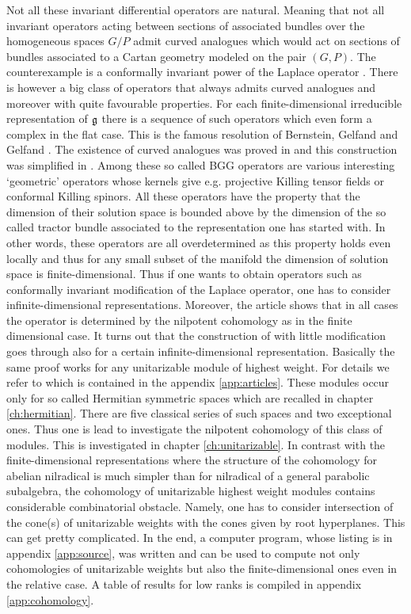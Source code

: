 Not all these invariant differential operators are natural. Meaning that not all invariant operators acting between sections of associated bundles over the homogeneous spaces $G/P$ admit curved analogues which would act on sections of bundles associated to a Cartan geometry modeled on the pair $(G, P)$. The counterexample is a conformally invariant power of the Laplace operator \cite{graham_conformally_1992, gover_conformally_2004}. There is however a big class of operators that always admits curved analogues and moreover with quite favourable properties. For each finite-dimensional irreducible representation of $\mathfrak{g}$ there is a sequence of such operators which even form a complex in the flat case. This is the famous resolution of Bernstein, Gelfand and Gelfand \cite{bernstein_differential_1975}. The existence of curved analogues was proved in \cite{cap_bernstein-gelfand-gelfand_2001} and this construction was simplified in \cite{calderbank_differential_2001}. Among these so called BGG operators are various interesting `geometric' operators whose kernels give e.g. projective Killing tensor fields or conformal Killing spinors. All these operators have the property that the dimension of their solution space is bounded above by the dimension of the so called tractor bundle associated to the representation one has started with. In other words, these operators are all overdetermined as this property holds even locally and thus for any small subset of the manifold the dimension of solution space is finite-dimensional. Thus if one wants to obtain operators such as conformally invariant modification of the Laplace operator, one has to consider infinite-dimensional representations. Moreover, the article \cite{shaynkman_unfolded_2006} shows that in all cases the operator is determined by the nilpotent cohomology as in the finite dimensional case. It turns out that the construction of \cite{calderbank_differential_2001} with little modification goes through also for a certain infinite-dimensional representation. Basically the same proof works for any unitarizable module of highest weight. For details we refer to \cite{tucek_yamabe_2012} which is contained in the appendix \ref{app:articles}. These modules occur only for so called Hermitian symmetric spaces which are recalled in chapter \ref{ch:hermitian}. There are five classical series of such spaces and two exceptional ones. Thus one is lead to investigate the nilpotent cohomology of this class of modules. This is investigated in chapter \ref{ch:unitarizable}. In contrast with the finite-dimensional representations where the structure of the cohomology for abelian nilradical is much simpler than for nilradical of a general parabolic subalgebra, the cohomology of unitarizable highest weight modules contains considerable combinatorial obstacle. Namely, one has to consider intersection of the cone(s) of unitarizable weights with the cones given by root hyperplanes. This can get pretty complicated. In the end, a computer program, whose listing is in appendix \ref{app:source}, was written and can be used to compute not only cohomologies of unitarizable weights but also the finite-dimensional ones even in the relative case. A table of results for low ranks is compiled in appendix \ref{app:cohomology}.


